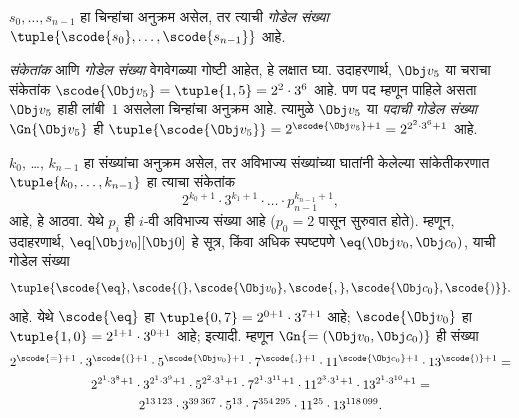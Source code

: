 \documentclass[../../../include/open-logic-section]{subfiles}
\begin{document}
\begin{defn}
$s_0, \dots, s_{n-1}$ हा चिन्हांचा अनुक्रम असेल, तर त्याची
\emph{गोडेल संख्या} $\tuple{\scode{s_0}, \dots, \scode{s_{n-1}}}$ आहे.
\end{defn}

\begin{explain}
\emph{संकेतांक} आणि \emph{गोडेल संख्या} वेगवेगळ्या गोष्टी आहेत,
हे लक्षात घ्या. उदाहरणार्थ, $\Obj v_5$ या चराचा संकेतांक
$\scode{\Obj v_5} = \tuple{1, 5} = 2^2\cdot 3^6$ आहे.
पण पद म्हणून पाहिले असता~$\Obj v_5$ हाही लांबी~$1$ असलेला
चिन्हांचा अनुक्रम आहे. त्यामुळे $\Obj v_5$ या \emph{पदाची}
\emph{गोडेल संख्या}~$\Gn{\Obj v_5}$ ही
$\tuple{\scode{\Obj v_5}} = 2^{\scode{\Obj v_5} + 1} =
2^{2^2\cdot 3^6 + 1}$ आहे.
\end{explain}

\begin{ex}
$k_0$, \dots, $k_{n-1}$ हा संख्यांचा अनुक्रम असेल, तर
अविभाज्य संख्यांच्या घातांनी केलेल्या सांकेतीकरणात
$\tuple{k_0, \dots, k_{n-1}}$ हा त्याचा संकेतांक
\[
2^{k_0+1}\cdot3^{k_1+1}\cdot \dots \cdot p_{n-1}^{k_{n-1}+1},
\]
आहे, हे आठवा. येथे $p_i$ ही $i$-वी अविभाज्य संख्या आहे
($p_0 = 2$ पासून सुरुवात होते). म्हणून, उदाहरणार्थ,
$\eq[\Obj v_0][\Obj 0]$ हे सूत्र, किंवा अधिक स्पष्टपणे
${\eq}(\Obj v_0,\Obj c_0)$, याची गोडेल संख्या
\[
\tuple{\scode{\eq},\scode{(},\scode{\Obj v_0},\scode{,}, \scode{\Obj
    c_0},\scode{)}}.
\]
आहे. येथे $\scode{\eq}$ हा $\tuple{0,7} = 2^{0+1}\cdot
3^{7+1}$ आहे; $\scode{\Obj v_0}$ हा $\tuple{1,0} = 2^{1+1}\cdot3^{0+1}$
आहे; इत्यादी. म्हणून $\Gn{=(\Obj v_0,\Obj c_0)}$ ही संख्या
\begin{multline*}
2^{\scode{=} + 1}\cdot 3^{\scode{(}+1}\cdot 5^{\scode{\Obj v_0}+1}
\cdot 7^{\scode{,} + 1} \cdot 11^{\scode{\Obj c_0}+1} \cdot
13^{\scode{)}+1} = \\
2^{2^1\cdot 3^8 + 1}\cdot 3^{2^1\cdot 3^9+1}\cdot 5^{2^2\cdot 3^1+1}
\cdot 7^{2^1\cdot 3^{11} + 1} \cdot 11^{2^3\cdot3^1+1} \cdot
13^{2^1\cdot3^{10}+1} = \\
2^{13\,123}\cdot 3^{39\,367}\cdot 5^{13}\cdot 7^{354\,295}\cdot11^{25}\cdot13^{118\,099}.
\end{multline*}
\end{ex}
\end{document}
